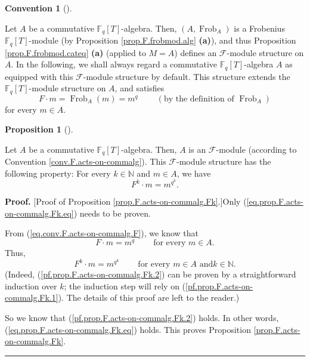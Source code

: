 \documentclass[numbers=enddot,12pt,final,onecolumn,notitlepage]{scrartcl}%
\theoremstyle{definition}
\newtheorem{prop}[theo]{Proposition}
\newenvironment{proposition}[1][]
{\begin{prop}[#1]\begin{leftbar}}
{\end{leftbar}\end{prop}}
\newtheorem{conv}[theo]{Convention}
\newenvironment{condition}[1][]
{\begin{conv}[#1]\begin{leftbar}}
{\end{leftbar}\end{conv}}
\newenvironment{proof}[1][Proof]{\noindent\textbf{#1.} }{\ \rule{0.5em}{0.5em}}
\begin{document}
\begin{condition}
\label{conv.F.acts-on-commalg}Let $A$ be a commutative $\mathbb{F}_{q}\left[
T\right]  $-algebra. Then, $\left(  A,\operatorname*{Frob}\nolimits_{A}%
\right)  $ is a Frobenius $\mathbb{F}_{q}\left[  T\right]  $-module (by
Proposition \ref{prop.F.frobmod.alg} \textbf{(a)}), and thus Proposition
\ref{prop.F.frobmod.cateq} \textbf{(a)} (applied to $M=A$) defines an
$\mathcal{F}$-module structure on $A$. In the following, we shall always
regard a commutative $\mathbb{F}_{q}\left[  T\right]  $-algebra $A$ as
equipped with this $\mathcal{F}$-module structure by default. This structure
extends the $\mathbb{F}_{q}\left[  T\right]  $-module structure on $A$, and
satisfies%
\begin{equation}
F\cdot m=\operatorname*{Frob}\nolimits_{A}\left(  m\right)  =m^{q}%
\ \ \ \ \ \ \ \ \ \ \left(  \text{by the definition of }\operatorname*{Frob}%
\nolimits_{A}\right)  \label{eq.conv.F.acts-on-commalg.F}%
\end{equation}
for every $m\in A$.
\end{condition}

\begin{proposition}
\label{prop.F.acts-on-commalg.Fk}Let $A$ be a commutative $\mathbb{F}%
_{q}\left[  T\right]  $-algebra. Then, $A$ is an $\mathcal{F}$-module
(according to Convention \ref{conv.F.acts-on-commalg}). This $\mathcal{F}%
$-module structure has the following property: For every $k\in\mathbb{N}$ and
$m\in A$, we have%
\begin{equation}
F^{k}\cdot m=m^{q^{k}}. \label{eq.prop.F.acts-on-commalg.Fk.eq}%
\end{equation}

\end{proposition}

\begin{proof}
[Proof of Proposition \ref{prop.F.acts-on-commalg.Fk}.]Only
(\ref{eq.prop.F.acts-on-commalg.Fk.eq}) needs to be proven.

From (\ref{eq.conv.F.acts-on-commalg.F}), we know that%
\begin{equation}
F\cdot m=m^{q}\ \ \ \ \ \ \ \ \ \ \text{for every }m\in A.
\label{pf.prop.F.acts-on-commalg.Fk.1}%
\end{equation}
Thus,%
\begin{equation}
F^{k}\cdot m=m^{q^{k}}\ \ \ \ \ \ \ \ \ \ \text{for every }m\in A\text{ and
}k\in\mathbb{N}. \label{pf.prop.F.acts-on-commalg.Fk.2}%
\end{equation}
(Indeed, (\ref{pf.prop.F.acts-on-commalg.Fk.2}) can be proven by a
straightforward induction over $k$; the induction step will rely on
(\ref{pf.prop.F.acts-on-commalg.Fk.1}). The details of this proof are left to
the reader.)

So we know that (\ref{pf.prop.F.acts-on-commalg.Fk.2}) holds. In other words,
(\ref{eq.prop.F.acts-on-commalg.Fk.eq}) holds. This proves Proposition
\ref{prop.F.acts-on-commalg.Fk}.
\end{proof}
\end{document}
